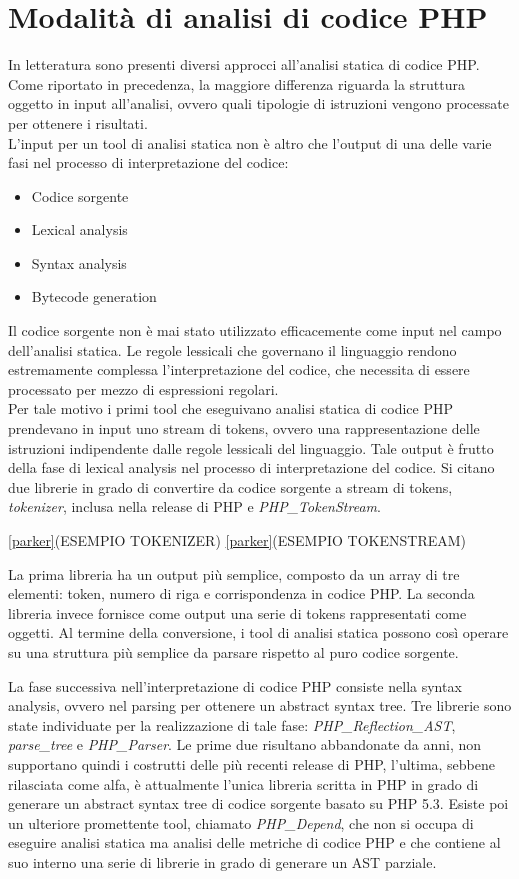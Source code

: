 \section{Modalità di analisi di codice PHP}
In letteratura sono presenti diversi approcci all'analisi statica di codice PHP. Come riportato in precedenza, la maggiore differenza riguarda la struttura oggetto in input all'analisi, ovvero quali tipologie di istruzioni vengono processate per ottenere i risultati.\\
L'input per un tool di analisi statica non è altro che l'output di una delle varie fasi nel processo di interpretazione del codice:
\begin{itemize}
\item Codice sorgente
\item Lexical analysis
\item Syntax analysis
\item Bytecode generation
\end{itemize}
Il codice sorgente non è mai stato utilizzato efficacemente come input nel campo dell'analisi statica. Le regole lessicali che governano il linguaggio rendono estremamente complessa l'interpretazione del codice, che necessita di essere processato per mezzo di espressioni regolari.\\
Per tale motivo i primi tool che eseguivano analisi statica di codice PHP prendevano in input uno stream di tokens, ovvero una rappresentazione delle istruzioni indipendente dalle regole lessicali del linguaggio. Tale output è frutto della fase di lexical analysis nel processo di interpretazione del codice.
Si citano due librerie in grado di convertire da codice sorgente a stream di tokens, \emph{tokenizer}, inclusa nella release di PHP e \emph{PHP\_TokenStream}.

\ref{parker}(ESEMPIO TOKENIZER)
\ref{parker}(ESEMPIO TOKENSTREAM)

La prima libreria ha un output più semplice, composto da un array di tre elementi: token, numero di riga e corrispondenza in codice PHP. La seconda libreria invece fornisce come output una serie di tokens rappresentati come oggetti.
Al termine della conversione, i tool di analisi statica possono così operare su una struttura più semplice da parsare rispetto al puro codice sorgente.

La fase successiva nell'interpretazione di codice PHP consiste nella syntax analysis, ovvero nel parsing per ottenere un abstract syntax tree. Tre librerie sono state individuate per la realizzazione di tale fase: \emph{PHP\_Reflection\_AST}, \emph{parse\_tree} e \emph{PHP\_Parser}. Le prime due risultano abbandonate da anni, non supportano quindi i costrutti delle più recenti release di PHP, l'ultima, sebbene rilasciata come alfa, è attualmente l'unica libreria scritta in PHP in grado di generare un abstract syntax tree di codice sorgente basato su PHP 5.3. Esiste poi un ulteriore promettente tool, chiamato \emph{PHP\_Depend}, che non si occupa di eseguire analisi statica ma analisi delle metriche di codice PHP e che contiene al suo interno una serie di librerie in grado di generare un AST parziale.

